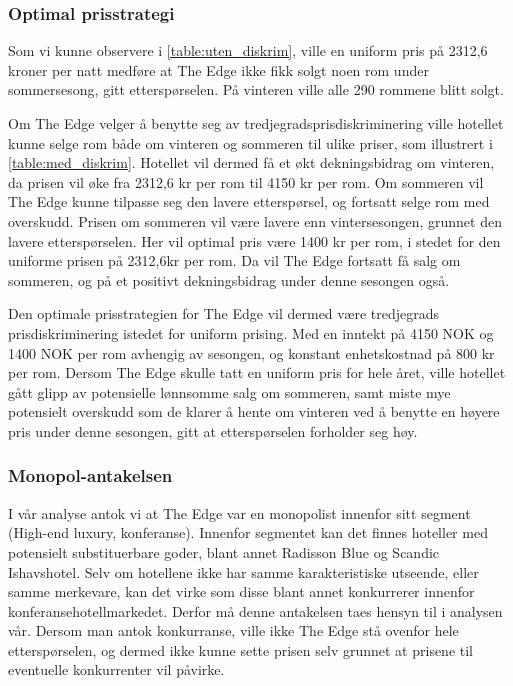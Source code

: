 \documentclass[
  12pt,
  a4paper,
  DIV=11,
  numbers=noendperiod]{scrartcl}
\begin{document}
\subsubsection{Optimal prisstrategi}\label{optimal-prisstrategi}

Som vi kunne observere i \autoref{table:uten_diskrim}, ville en uniform
pris på 2312,6 kroner per natt medføre at The Edge ikke fikk solgt noen
rom under sommersesong, gitt etterspørselen. På vinteren ville alle 290
rommene blitt solgt.

Om The Edge velger å benytte seg av tredjegradsprisdiskriminering ville
hotellet kunne selge rom både om vinteren og sommeren til ulike priser,
som illustrert i \autoref{table:med_diskrim}. Hotellet vil dermed få et
økt dekningsbidrag om vinteren, da prisen vil øke fra 2312,6 kr per rom
til 4150 kr per rom. Om sommeren vil The Edge kunne tilpasse seg den
lavere etterspørsel, og fortsatt selge rom med overskudd. Prisen om
sommeren vil være lavere enn vintersesongen, grunnet den lavere
etterspørselen. Her vil optimal pris være 1400 kr per rom, i stedet for
den uniforme prisen på 2312,6kr per rom. Da vil The Edge fortsatt få
salg om sommeren, og på et positivt dekningsbidrag under denne sesongen
også.

Den optimale prisstrategien for The Edge vil dermed være tredjegrads
prisdiskriminering istedet for uniform prising. Med en inntekt på 4150
NOK og 1400 NOK per rom avhengig av sesongen, og konstant enhetskostnad
på 800 kr per rom. Dersom The Edge skulle tatt en uniform pris for hele
året, ville hotellet gått glipp av potensielle lønnsomme salg om
sommeren, samt miste mye potensielt overskudd som de klarer å hente om
vinteren ved å benytte en høyere pris under denne sesongen, gitt at
etterspørselen forholder seg høy.

\subsubsection{Monopol-antakelsen}\label{monopol-antakelsen}

I vår analyse antok vi at The Edge var en monopolist innenfor sitt
segment (High-end luxury, konferanse). Innenfor segmentet kan det finnes
hoteller med potensielt substituerbare goder, blant annet Radisson Blue
og Scandic Ishavshotel. Selv om hotellene ikke har samme karakteristiske
utseende, eller samme merkevare, kan det virke som disse blant annet
konkurrerer innenfor konferansehotellmarkedet. Derfor må denne
antakelsen taes hensyn til i analysen vår. Dersom man antok konkurranse,
ville ikke The Edge stå ovenfor hele etterspørselen, og dermed ikke
kunne sette prisen selv grunnet at prisene til eventuelle konkurrenter
vil påvirke.
\end{document}
